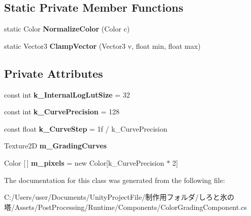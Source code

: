 \subsection*{Static Private Member Functions}
\begin{DoxyCompactItemize}
\item 
\mbox{\label{class_unity_engine_1_1_post_processing_1_1_color_grading_component_a87af0e41310076a6abb3a1476c0ee089}} 
static Color {\bfseries Normalize\+Color} (Color c)
\item 
\mbox{\label{class_unity_engine_1_1_post_processing_1_1_color_grading_component_a4926ef30ea700919ea542218c9666e35}} 
static Vector3 {\bfseries Clamp\+Vector} (Vector3 v, float min, float max)
\end{DoxyCompactItemize}
\subsection*{Private Attributes}
\begin{DoxyCompactItemize}
\item 
\mbox{\label{class_unity_engine_1_1_post_processing_1_1_color_grading_component_a47f6f9ef47432ef92eaf0f50a62cbbca}} 
const int {\bfseries k\+\_\+\+Internal\+Log\+Lut\+Size} = 32
\item 
\mbox{\label{class_unity_engine_1_1_post_processing_1_1_color_grading_component_a2ec5f0cd56b5ddfb30d77fe7d364ac4e}} 
const int {\bfseries k\+\_\+\+Curve\+Precision} = 128
\item 
\mbox{\label{class_unity_engine_1_1_post_processing_1_1_color_grading_component_ad92888374d8c7a1f096df618e2e30428}} 
const float {\bfseries k\+\_\+\+Curve\+Step} = 1f / k\+\_\+\+Curve\+Precision
\item 
\mbox{\label{class_unity_engine_1_1_post_processing_1_1_color_grading_component_a9a4bc1c63cebb8bace5167bc03bf4282}} 
Texture2D {\bfseries m\+\_\+\+Grading\+Curves}
\item 
\mbox{\label{class_unity_engine_1_1_post_processing_1_1_color_grading_component_a2e635890623551fe9e57b30bcaba73a6}} 
Color \mbox{[}$\,$\mbox{]} {\bfseries m\+\_\+pixels} = new Color\mbox{[}k\+\_\+\+Curve\+Precision $\ast$ 2\mbox{]}
\end{DoxyCompactItemize}


The documentation for this class was generated from the following file\+:\begin{DoxyCompactItemize}
\item 
C\+:/\+Users/user/\+Documents/\+Unity\+Project\+File/制作用フォルダ/しろと氷の塔/\+Assets/\+Post\+Processing/\+Runtime/\+Components/Color\+Grading\+Component.\+cs\end{DoxyCompactItemize}

